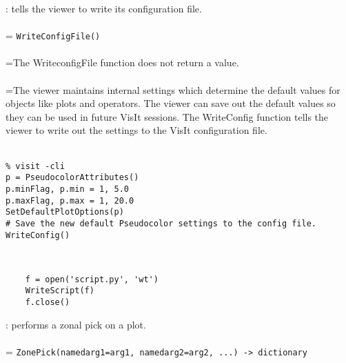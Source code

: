 \documentclass[10pt,a4paper]{report}
\begin{document}
{}
: tells the viewer to write its configuration file.\\[-3mm]

 \\ 
\hangindent=\parindent 
\verb!WriteConfigFile()!\\ [-3mm]

 \\ 
\hangindent=\parindent The WriteconfigFile function does not return a value. \\[-3mm] 

 \\ 
\hangindent=\parindent The viewer maintains internal settings which determine the default values for objects like plots and operators. The viewer can save out the default values so they can be used in future VisIt sessions. The WriteConfig function tells the viewer to write out the settings to the VisIt configuration file. \\[-3mm] 

\\[-6mm]
\begin{verbatim}% visit -cli
p = PseudocolorAttributes()
p.minFlag, p.min = 1, 5.0
p.maxFlag, p.max = 1, 20.0
SetDefaultPlotOptions(p)
# Save the new default Pseudocolor settings to the config file.
WriteConfig()
\end{verbatim}
\newpage

\\[-6mm]
\begin{verbatim}    f = open('script.py', 'wt')
    WriteScript(f)
    f.close()
\end{verbatim}
\newpage


{}
: performs a zonal pick on a plot.\\[-3mm]

 \\ 
\hangindent=\parindent 
\verb!ZonePick(namedarg1=arg1, namedarg2=arg2, ...) -> dictionary!\\ [-3mm]
\end{document}
